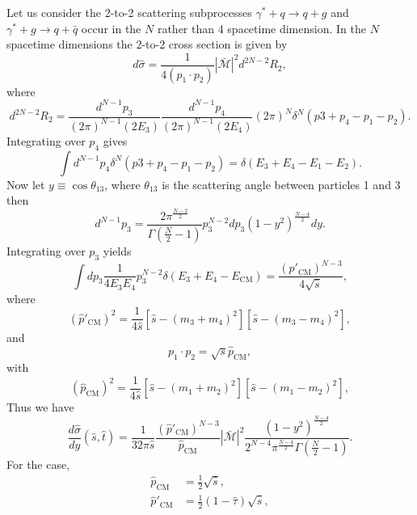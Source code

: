 Let us consider the 2-to-2 scattering subprocesses $\gamma^\ast+q\to q+g$ and $\gamma^\ast+g\to q+\bar{q}$ occur in the $N$ rather than 4 spacetime dimension. In the $N$ spacetime dimensions the 2-to-2 cross section is given by
\begin{equation}
d\hat{\sigma}=\frac{1}{4(p_1\cdot p_2)}\left|\bar{\mathcal{M}}\right|^2 d^{2N-2}R_2,
\end{equation} 
where
\begin{equation}
d^{2N-2}R_2=\frac{d^{N-1}p_3}{(2\pi)^{N-1}(2E_3)}\frac{d^{N-1}p_4}{(2\pi)^{N-1}(2E_4)}(2\pi)^N\delta^N(p3+p_4-p_1-p_2).
\end{equation}
Integrating over $p_4$ gives
\begin{equation}
\int d^{N-1}p_4\delta^N(p3+p_4-p_1-p_2)=\delta(E_3+E_4-E_1-E_2).
\end{equation}
Now let $y\equiv \cos\theta_{13}$, where $\theta_{13}$ is the scattering angle between particles 1 and 3 then
\begin{equation}
d^{N-1}p_3=\frac{2\pi^\frac{N-2}{2}}{\Gamma\left(\frac{N}{2}-1\right)}p^{N-2}_3dp_3(1-y^2)^\frac{N-4}{2}dy.
\end{equation}
Integrating over $p_3$ yields
\begin{equation}
\int dp_3\frac{1}{4E_3E_4}p^{N-2}_3\delta(E_3+E_4-E_\text{CM})=\frac{(p'_\text{CM})^{N-3}}{4\sqrt{\hat{s}}},
\end{equation}
where
\begin{equation}
(\hat{p}'_\text{CM})^2=\frac{1}{4\hat{s}}[\hat{s}-(m_3+m_4)^2][\hat{s}-(m_3-m_4)^2],
\end{equation}
and 
\begin{equation}
p_1\cdot p_2=\sqrt{s}\hat{p}_\text{CM},
\end{equation}
with
\begin{equation}
(\hat{p}_\text{CM})^2=\frac{1}{4\hat{s}}[\hat{s}-(m_1+m_2)^2][\hat{s}-(m_1-m_2)^2],
\end{equation}
Thus we have 
\begin{equation}
\frac{d\hat{\sigma}}{dy}(\hat{s},\hat{t})=\frac{1}{32\pi\hat{s}}\frac{(\hat{p}'_\text{CM})^{N-3}}{\hat{p}_\text{CM}}\left|\bar{\mathcal{M}}\right|^2\frac{(1-y^2)^\frac{N-4}{2}}{2^{N-4}\pi^\frac{N-4}{2}\Gamma\left(\frac{N}{2}-1\right)}.
\end{equation}
For the case,
\begin{align}
\hat{p}_\text{CM}&=\frac{1}{2}\sqrt{\hat{s}},\\
\hat{p}'_\text{CM}&=\frac{1}{2}(1-\hat{\tau})\sqrt{\hat{s}},
\end{align}
